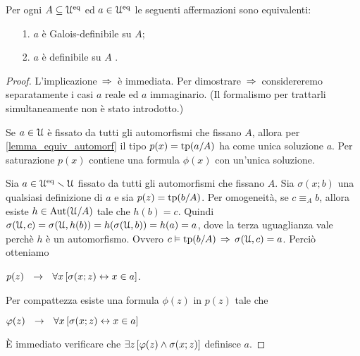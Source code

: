 \begin{theorem}\label{thm_Galois_def=def}
\label{galois1} Per ogni $A\subseteq\EuScript U^{\rm eq}$ ed $a\in\EuScript U^{\rm eq}$ le seguenti affermazioni sono equivalenti:
\begin{itemize}
\item[1.] $a$ \`e Galois-definibile su $A$;
\item[2.] $a$ \`e definibile su $A$ .
\end{itemize}
\end{theorem}
\begin{proof} L'implicazione $\,\Rightarrow\,$ \`e immediata. Per dimostrare $\,\Rightarrow\,$ considereremo separatamente i casi $a$ reale ed $a$ immaginario. (Il formalismo per trattarli simultaneamente non \`e stato introdotto.)

Se $a\in\EuScript U$ \`e fissato da tutti gli automorfismi che fissano $A$, allora per \ref{lemma_equiv_automorf} il tipo $p(x)=\textrm{tp}(a/A)$ ha come unica soluzione $a$. Per saturazione $p(x)$ contiene una formula $\phi(x)$ con un'unica soluzione.

Sia $a\in\EuScript U^{\rm eq}\smallsetminus\EuScript U$ fissato da tutti gli automorfismi che fissano $A$. Sia $\sigma(x;b)$ una qualsiasi definizione di $a$ e sia $p(z)=\textrm{tp}(b/A)$. Per omogeneit\`a, se $c \equiv_A b$, allora esiste $h\in\textrm{Aut}(\EuScript U/A)$ tale che $h(b)=c$. Quindi $\sigma(\EuScript U,c)=\sigma(\EuScript U,h(b))=h(\sigma(\EuScript U,b))=h(a)=a$, dove la terza uguaglianza vale perch\`e $h$ \`e un automorfismo. Ovvero $c \vDash \textrm{tp}(b/A) \, \Rightarrow \, \sigma(\EuScript U,c)=a$. Perci\`o otteniamo

\hfil$p(z)\ \ \rightarrow\ \ \forall x\,[\sigma(x;z)\leftrightarrow x\in a]$.

Per compattezza esiste una formula $\phi(z)$ in $p(z)$ tale che

\hfil$\varphi(z)\ \ \rightarrow\ \ \forall x\,[\sigma(x;z)\leftrightarrow x\in a]$

\`E immediato verificare che $\exists z\,[\varphi(z)\wedge\sigma(x;z)]$ definisce $a$.
%
%
\end{proof}


